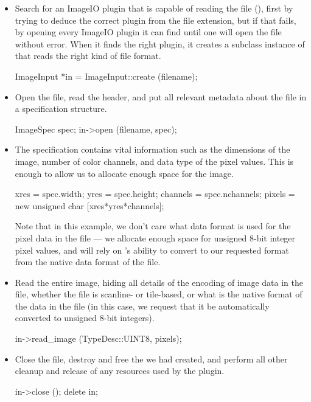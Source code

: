 \begin{itemize}
\item Search for an ImageIO plugin that is capable of reading the file
  (), first by trying to deduce the correct plugin from the
  file extension, but if that fails, by opening every ImageIO plugin it
  can find until one will open the file without error.  When it finds
  the right plugin, it creates a subclass instance of \ImageInput that
  reads the right kind of file format.
  \begin{code}
        ImageInput *in = ImageInput::create (filename);
  \end{code}
\item Open the file, read the header, and put all relevant metadata
  about the file in a specification structure.
  \begin{code}
        ImageSpec spec;
        in->open (filename, spec);
  \end{code}
\item The specification contains vital information such as the
  dimensions of the image, number of color channels, and data type of
  the pixel values.  This is enough to allow us to allocate enough space
  for the image.
  \begin{code}
        xres = spec.width;
        yres = spec.height;
        channels = spec.nchannels;
        pixels = new unsigned char [xres*yres*channels];
  \end{code}
  Note that in this example, we don't care what data format is used for
  the pixel data in the file --- we allocate enough space for unsigned
  8-bit integer pixel values, and will rely on \product's ability to
  convert to our requested format from the native data format of the
  file.
\item Read the entire image, hiding all details of the encoding of image
  data in the file, whether the file is scanline- or tile-based, or what
  is the native format of the data in the file (in this case, we request
  that it be automatically converted to unsigned 8-bit integers).
  \begin{code}
        in->read_image (TypeDesc::UINT8, pixels);
  \end{code}
\item Close the file, destroy and free the \ImageInput we had created,
  and perform all other cleanup and release of any resources used by
  the plugin.
  \begin{code}
        in->close ();
        delete in;
  \end{code}
\end{itemize}



